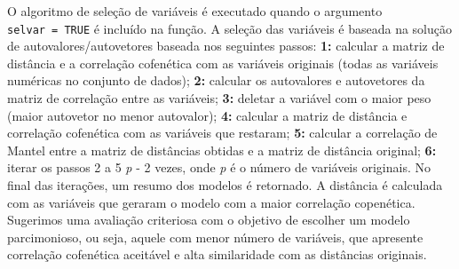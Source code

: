 \documentclass[
]{book}
\begin{document}
O algoritmo de seleção de variáveis é executado quando o argumento \texttt{selvar\ =\ TRUE} é incluído na função. A seleção das variáveis é baseada na solução de autovalores/autovetores baseada nos seguintes passos: \textbf{1:} calcular a matriz de distância e a correlação cofenética com as variáveis originais (todas as variáveis numéricas no conjunto de dados); \textbf{2:} calcular os autovalores e autovetores da matriz de correlação entre as variáveis; \textbf{3:} deletar a variável com o maior peso (maior autovetor no menor autovalor); \textbf{4:} calcular a matriz de distância e correlação cofenética com as variáveis que restaram; \textbf{5:} calcular a correlação de Mantel entre a matriz de distâncias obtidas e a matriz de distância original; \textbf{6:} iterar os passos 2 a 5 \emph{p} - 2 vezes, onde \emph{p} é o número de variáveis originais. No final das iterações, um resumo dos modelos é retornado. A distância é calculada com as variáveis que geraram o modelo com a maior correlação copenética. Sugerimos uma avaliação criteriosa com o objetivo de escolher um modelo parcimonioso, ou seja, aquele com menor número de variáveis, que apresente correlação cofenética aceitável e alta similaridade com as distâncias originais.
\end{document}
